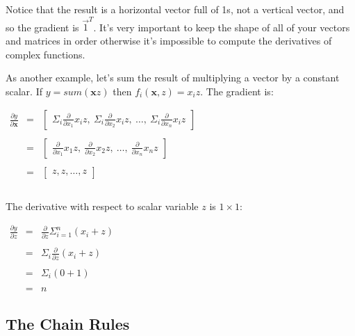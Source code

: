 \documentclass[11pt]{article}
\begin{document}
Notice that the result is a horizontal vector full of 1s, not a vertical vector, and so the gradient is $\vec{1}^T$.  It's very important to keep the shape of all of your vectors and matrices in order otherwise it's impossible to compute the derivatives of complex functions.

As another example, let's sum the result of multiplying a vector by a constant scalar.  If $y = sum(\mathbf{x} z)$ then $f_i(\mathbf{x},z) = x_i z$. The gradient is:

$
\begin{array}{lcl}
\frac{\partial y}{\partial \mathbf{x}} & = & \begin{bmatrix} \Sigma_i \frac{\partial}{\partial x_1} x_i z,~ \Sigma_i \frac{\partial }{\partial x_2} x_i z,~ \ldots,~ \Sigma_i \frac{\partial}{\partial x_n} x_i z  \end{bmatrix}\\\\
 & = & \begin{bmatrix} \frac{\partial}{\partial x_1} x_1 z,~ \frac{\partial }{\partial x_2} x_2 z,~ \ldots,~ \frac{\partial}{\partial x_n} x_n z  \end{bmatrix}\\\\
 & = & \begin{bmatrix} z, z, \ldots, z \end{bmatrix}\\\\
\end{array}
$

The derivative with respect to scalar variable $z$ is $1 \times 1$:

$
\begin{array}{lcl}
\frac{\partial y}{\partial z} & = & \frac{\partial}{\partial z} \Sigma_{i=1}^n (x_i+z)\\\\
& = & \Sigma_i \frac{\partial}{\partial z} (x_i+z)\\\\
& = & \Sigma_i (0 + 1)\\\\
& = & n
\end{array}
$

\subsection{The Chain Rules}
\end{document}
